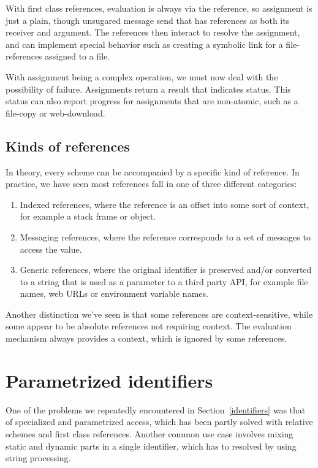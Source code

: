 \documentclass[preprint,authoryear]{llncs}
\begin{document}
With first class references, evaluation is always via the reference, so assignment is just a plain, though unsugared
message send that has references as both its receiver and argument.  The references then interact to resolve
the assignment, and can implement special behavior such as creating a symbolic link for a file-references assigned
to a file.

With assignment being a complex operation, we must now deal with the possibility of failure.  Assignments 
return a result that indicates status.  This status can also report progress for assignments that are
non-atomic, such as a file-copy or web-download.



\subsection{Kinds of references}
\label{refkinds}
In theory, every scheme can be accompanied by a specific kind of reference.  In practice, we have 
seen most references fall in one of three different categories:

\begin{enumerate}
\item Indexed references, where the reference is an offset into some sort of context, for
	example a stack frame or object.
\item Messaging references, where the reference corresponds to a set of messages to
	access the value.
\item Generic references, where the original identifier is preserved and/or converted to
	a string that is used as a parameter to a third party API, for example file names,
	web URLs or environment variable names.
\end{enumerate}

Another distinction we've seen is that some references are context-sensitive, while some
appear to be absolute references not requiring context.  The evaluation mechanism always
provides a context, which is ignored by some references.  


\section{Parametrized identifiers}
\label{parametrized}

One of the problems we repeatedly encountered in Section~\ref{identifiers} was 
that of specialized and parametrized access, which has been partly solved with
relative schemes and first class references.  Another common use case involves
mixing static and dynamic parts in a single identifier, which has to resolved by
using string processing.
\end{document}
